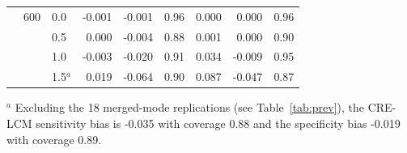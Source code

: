 \begin{table}[htbp]
\begin{tabular}{lllrrrrrr}
 & 600 & 0.0 & -0.001 & -0.001 & 0.96 & 0.000 & 0.000 & 0.96 \\
 &  & 0.5 & 0.000 & -0.004 & 0.88 & 0.001 & 0.000 & 0.90 \\
 &  & 1.0 & -0.003 & -0.020 & 0.91 & 0.034 & -0.009 & 0.95 \\
 &  & 1.5$^{a}$ & 0.019 & -0.064 & 0.90 & 0.087 & -0.047 & 0.87 \\
\bottomrule
\end{tabular}
\begin{flushleft}\footnotesize
$^{a}$ Excluding the 18 merged-mode replications (see Table~\ref{tab:prev}), the CRE-LCM sensitivity bias is -0.035 with coverage 0.88 and the specificity bias -0.019 with coverage 0.89.
\end{flushleft}
\end{table}
